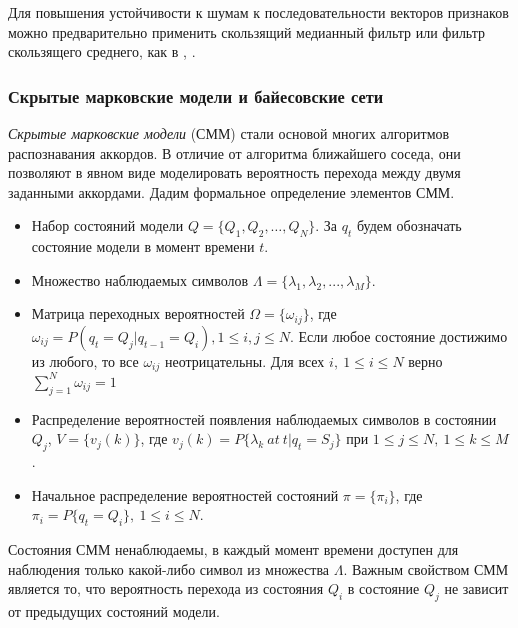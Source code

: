 Для повышения устойчивости к шумам к последовательности векторов признаков
можно предварительно применить скользящий медианный фильтр или фильтр
скользящего среднего, как в \cite{Lee2006}, \cite{Oudre2009}. 

\subsubsection{Скрытые марковские модели и байесовские сети}

\emph{Скрытые марковские модели} (СММ) \cite{Rabiner1989} стали основой многих
алгоритмов распознавания аккордов. В отличие от алгоритма ближайшего соседа, они
позволяют в явном виде моделировать вероятность перехода между двумя заданными
аккордами. Дадим формальное определение элементов СММ.

\begin{itemize}

\item Набор состояний модели $Q = \{Q_1, Q_2, \ldots , Q_N\}$. За
$q_t$ будем обозначать состояние модели в момент времени $t$.

\item Множество наблюдаемых символов $\Lambda = \{\lambda_1, \lambda_2, ...,
\lambda_M\}$.

\item Матрица переходных вероятностей $\Omega = \{\omega_{ij}\}$, где
$\omega_{ij} = P(q_t = Q_j | q_{t-1} = Q_i), \! 1 \leq i,j \leq N$. Если любое
состояние достижимо из любого, то все $\omega_{ij}$ неотрицательны. Для всех
$i,~1 \leq i \leq N$ верно $\sum_{j=1}^N \omega_{ij} = 1$

\item Распределение вероятностей появления наблюдаемых символов в состоянии
$Q_j$, $V=\{v_j(k)\}$, где $v_j(k) = P\{\lambda_k \: at \: t|q_t = S_j\}$ при $1
\leq j \leq N, \: 1 \leq k \leq M$.

\item Начальное распределение вероятностей состояний $\pi =
\{\pi_i\}$, где $\pi_i = P\{q_t = Q_i\}, \: 1 \leq i \leq N$.

\end{itemize}

Состояния СММ ненаблюдаемы, в каждый момент времени доступен для наблюдения
только какой-либо символ из множества $\Lambda$. Важным свойством СММ является
то, что вероятность перехода из состояния $Q_i$ в состояние $Q_j$ не зависит от
предыдущих состояний модели.

